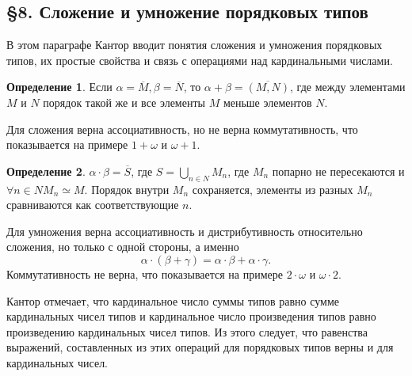 \documentclass[a4paper,12pt]{extarticle}
\theoremstyle{definition}
\newtheorem{definition}{Определение}
\begin{document}
\subsection{\S 8. Сложение и умножение порядковых типов}
В этом параграфе Кантор вводит понятия сложения и умножения порядковых типов, их простые свойства и связь с операциями над кардинальными числами.
\begin{definition}
    Если $\alpha = \overline{M}, \beta = \overline{N}$, то $\alpha + \beta = \overline{(M, N)}$, где между элементами $M$ и $N$ порядок такой же и все элементы $M$ меньше элементов $N$.
\end{definition}
Для сложения верна ассоциативность, но не верна коммутативность, что показывается на примере $1 + \omega$ и $\omega + 1$.
\begin{definition}
    $\alpha \cdot \beta = \overline{S}$, где $S = \bigcup\limits_{n \in N}M_n$, где $M_n$ попарно не пересекаются и $\forall n \in N M_n \simeq M$.
    Порядок внутри $M_n$ сохраняется, элементы из разных $M_n$ сравниваются как соответствующие $n$.
\end{definition}
Для умножения верна ассоциативность и дистрибутивность относительно сложения, но только с одной стороны, а именно $$\alpha \cdot (\beta + \gamma) = \alpha \cdot \beta + \alpha \cdot \gamma.$$
Коммутативность не верна, что показывается на примере $2 \cdot \omega$ и $\omega \cdot 2$.

Кантор отмечает, что кардинальное число суммы типов равно сумме кардинальных чисел типов и кардинальное число произведения типов равно произведению кардинальных чисел типов.
Из этого следует, что равенства выражений, составленных из этих операций для порядковых типов верны и для кардинальных чисел.
\end{document}

